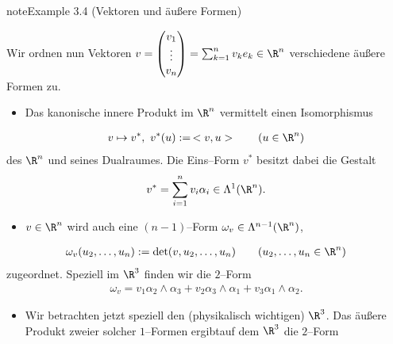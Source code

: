 \documentclass[letterpaper,10pt,english]{jupyterBook}
\begin{document}
\begin{sphinxadmonition}{note}{Example 3.4 (Vektoren und äußere Formen)}



\sphinxAtStartPar
Wir ordnen nun Vektoren
\(v = \begin{pmatrix} v_1\\ \vdots\\ v_n \end{pmatrix} =\sum_{k=1}^nv_ke_k\in\R^n\) verschiedene äußere Formen zu.
\begin{itemize}
\item {} 
\sphinxAtStartPar
Das kanonische innere Produkt im \(\R^n\) vermittelt einen Isomorphismus

\end{itemize}
\begin{equation*}
\begin{split}v\mapsto v^*,\ v^*(u) :=\, < v,u > \qquad(u\in\R^n)\end{split}
\end{equation*}
\sphinxAtStartPar
des \(\R^n\) und seines Dualraumes. Die Eins–Form \(v^*\) besitzt dabei die Gestalt
\begin{equation*}
\begin{split}v^* = \sum_{i=1}^nv_i\alpha_i
\in\Lambda^1(\R^n).\end{split}
\end{equation*}\begin{itemize}
\item {} 
\sphinxAtStartPar
\(v\in\R^n\) wird auch eine \((n-1)\)–Form \(\omega_v\in\Lambda^{n-1}(\R^n)\),

\end{itemize}
\begin{equation*}
\begin{split}\omega_v(u_2,\ldots,u_n) := \det(v,u_2,\ldots,u_n) \qquad (u_2,\ldots,u_n\in\R^n)\end{split}
\end{equation*}
\sphinxAtStartPar
zugeordnet. Speziell im \(\R^3\) finden wir die \(2\)–Form
\begin{equation*}
\begin{split}\omega_v = v_1\alpha_2\wedge\alpha_3+v_2\alpha_3\wedge\alpha_1+v_3
\alpha_1\wedge\alpha_2.\end{split}
\end{equation*}\begin{itemize}
\item {} 
\sphinxAtStartPar
Wir betrachten jetzt speziell den (physikalisch wichtigen) \(\R^3\).
Das äußere Produkt zweier solcher \(1\)–Formen ergibtauf dem \(\R^3\) die \(2\)–Form


\end{itemize}
\end{sphinxadmonition}
\end{document}

